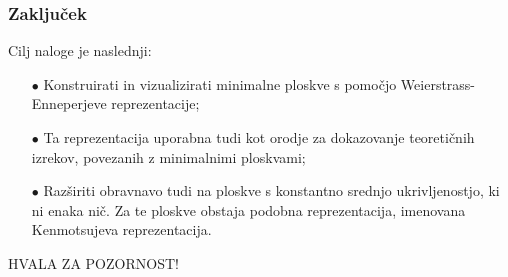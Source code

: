 \documentclass[10pt]{beamer}
\theoremstyle{definition}
\theoremstyle{remark}
\theoremstyle{plain}
\numberwithin{equation}{section}  %
\begin{document}
\begin{frame}
    \frametitle{Zaključek}

    Cilj naloge je naslednji:
    \begin{itemize}
        \item[$\bullet$] Konstruirati in vizualizirati minimalne ploskve s pomočjo Weierstrass-Enneperjeve reprezentacije;
        \item[$\bullet$] Ta reprezentacija uporabna tudi kot orodje za dokazovanje teoretičnih izrekov, povezanih z minimalnimi ploskvami;
        \item[$\bullet$] Razširiti obravnavo tudi na ploskve s konstantno srednjo ukrivljenostjo, ki ni enaka nič. Za te ploskve obstaja podobna reprezentacija, imenovana Kenmotsujeva reprezentacija.
    \end{itemize}

\end{frame}

\begin{frame}
    \begin{center}
        \LARGE HVALA ZA POZORNOST!
    \end{center}
\end{frame}
\end{document}
